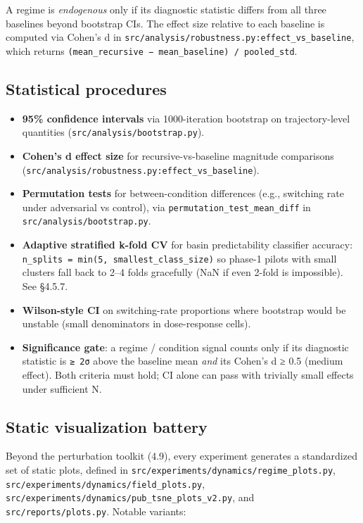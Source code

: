 \documentclass{article}
\theoremstyle{plain}
\theoremstyle{definition}
\begin{document}
A regime is \textit{endogenous} only if its diagnostic statistic differs from
all three baselines beyond bootstrap CIs. The effect size relative to
each baseline is computed via Cohen's d in
\texttt{src/analysis/robustness.py:effect\_vs\_baseline}, which returns
\texttt{(mean\_recursive − mean\_baseline) / pooled\_std}.

\subsection{Statistical procedures}

\begin{itemize}
  \item \textbf{95\% confidence intervals} via 1000-iteration bootstrap on
  trajectory-level quantities (\texttt{src/analysis/bootstrap.py}).
  \item \textbf{Cohen's d effect size} for recursive-vs-baseline magnitude
  comparisons (\texttt{src/analysis/robustness.py:effect\_vs\_baseline}).
  \item \textbf{Permutation tests} for between-condition differences (e.g.,
  switching rate under adversarial vs control), via
  \texttt{permutation\_test\_mean\_diff} in \texttt{src/analysis/bootstrap.py}.
  \item \textbf{Adaptive stratified k-fold CV} for basin predictability classifier
  accuracy: \texttt{n\_splits = min(5, smallest\_class\_size)} so phase-1 pilots
  with small clusters fall back to 2–4 folds gracefully (NaN if even
  2-fold is impossible). See §4.5.7.
  \item \textbf{Wilson-style CI} on switching-rate proportions where bootstrap
  would be unstable (small denominators in dose-response cells).
  \item \textbf{Significance gate}: a regime / condition signal counts only if its
  diagnostic statistic is \texttt{≥ 2σ} above the baseline mean \textit{and} its
  Cohen's d ≥ 0.5 (medium effect). Both criteria must hold; CI alone
  can pass with trivially small effects under sufficient N.
\end{itemize}

\subsection{Static visualization battery}

Beyond the perturbation toolkit (4.9), every experiment generates a
standardized set of static plots, defined in
\texttt{src/experiments/dynamics/regime\_plots.py},
\texttt{src/experiments/dynamics/field\_plots.py},
\texttt{src/experiments/dynamics/pub\_tsne\_plots\_v2.py}, and
\texttt{src/reports/plots.py}. Notable variants:
\end{document}
